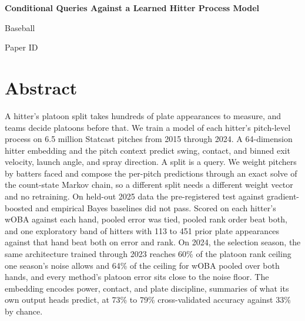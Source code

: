 \documentclass[11pt,letterpaper]{article}
\newcommand{\papertitle}{Conditional Queries Against a Learned Hitter Process Model}
\newcommand{\papertrack}{Baseball}  %
\newcommand{\paperid}{Paper ID}     %
\begin{document}
\raggedright
\setlength{\parindent}{0pt}
\setlength{\parskip}{11pt}
\thispagestyle{fancy}
\begin{center}
{\fontsize{18}{22}\selectfont\bfseries \papertitle\par}
\vspace{11pt}
{\fontsize{14}{17}\selectfont \papertrack\par \paperid\par}
\end{center}

\section*{Abstract}
A hitter's platoon split takes hundreds of plate appearances to measure, and teams decide platoons before that. We train a model of each hitter's pitch-level process on 6.5 million Statcast pitches from 2015 through 2024. A 64-dimension hitter embedding and the pitch context predict swing, contact, and binned exit velocity, launch angle, and spray direction. A split is a query. We weight pitchers by batters faced and compose the per-pitch predictions through an exact solve of the count-state Markov chain, so a different split needs a different weight vector and no retraining. On held-out 2025 data the pre-registered test against gradient-boosted and empirical Bayes baselines did not pass. Scored on each hitter's wOBA against each hand, pooled error was tied, pooled rank order beat both, and one exploratory band of hitters with 113 to 451 prior plate appearances against that hand beat both on error and rank. On 2024, the selection season, the same architecture trained through 2023 reaches 60\% of the platoon rank ceiling one season's noise allows and 64\% of the ceiling for wOBA pooled over both hands, and every method's platoon error sits close to the noise floor. The embedding encodes power, contact, and plate discipline, summaries of what its own output heads predict, at 73\% to 79\% cross-validated accuracy against 33\% by chance.
\end{document}
